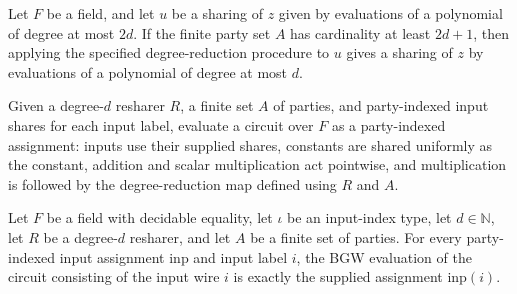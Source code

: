 \begin{theorem}
\label{TCSlib.MPC.BGW.isSharing_degreeReduce}
\leanok
{}
Let $F$ be a field, and let $u$ be a sharing of $z$ given by evaluations of a polynomial
of degree at most $2d$. If the finite party set $A$ has cardinality at least $2d+1$,
then applying the specified degree-reduction procedure to $u$ gives a sharing of $z$ by
evaluations of a polynomial of degree at most $d$.
\end{theorem}

\begin{definition}
\label{TCSlib.MPC.BGW.bgwEval}
\leanok
{}
Given a degree-$d$ resharer $R$, a finite set $A$ of parties, and party-indexed input
shares for each input label, evaluate a circuit over $F$ as a party-indexed assignment:
inputs use their supplied shares, constants are shared uniformly as the constant,
addition and scalar multiplication act pointwise, and multiplication is followed by the
degree-reduction map defined using $R$ and $A$.
\end{definition}

\begin{theorem}
\label{TCSlib.MPC.BGW.bgwEval_input}
\leanok
{}
Let $F$ be a field with decidable equality, let $\iota$ be an input-index type, let
$d\in\mathbb N$, let $R$ be a degree-$d$ resharer, and let $A$ be a finite set of
parties. For every party-indexed input assignment $\mathrm{inp}$ and input label $i$,
the BGW evaluation of the circuit consisting of the input wire $i$ is exactly the
supplied assignment $\mathrm{inp}(i)$.
\end{theorem}

